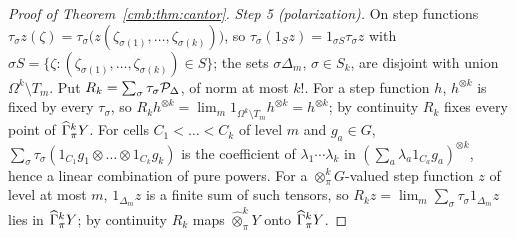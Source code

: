\begin{proof}[Proof of Theorem~\ref{cmb:thm:cantor}]
\emph{Step 5 (polarization).} On step functions $\tau_\sigma z(\zeta)=\tau_\sigma\bigl(z(\zeta_{\sigma(1)},\dots,
\zeta_{\sigma(k)})\bigr)$, so $\tau_\sigma(1_Sz)=1_{\sigma S}\tau_\sigma z$ with
$\sigma S=\{\zeta:(\zeta_{\sigma(1)},\dots,\zeta_{\sigma(k)})\in S\}$; the sets $\sigma\Delta_m$, $\sigma\in S_k$, are
disjoint with union $\Omega^k\setminus T_m$. Put $R_k=\sum_\sigma\tau_\sigma\mathcal P_\Delta$, of norm at most $k!$. For a step
function $h$, $h^{\otimes k}$ is fixed by every $\tau_\sigma$, so
$R_kh^{\otimes k}=\lim_m1_{\Omega^k\setminus T_m}h^{\otimes k}=h^{\otimes k}$; by continuity $R_k$ fixes every point of
$\widehat\Gamma^k_\pi Y$. For cells $C_1<\dots<C_k$ of level $m$ and $g_a\in G$,
$\sum_\sigma\tau_\sigma(1_{C_1}g_1\otimes\dots\otimes1_{C_k}g_k)$ is the coefficient of $\lambda_1\cdots\lambda_k$ in
$(\sum_a\lambda_a1_{C_a}g_a)^{\otimes k}$, hence a linear combination of pure powers. For a $\otimes^k_\pi G$-valued step
function $z$ of level at most $m$, $1_{\Delta_m}z$ is a finite sum of such tensors, so
$R_kz=\lim_m\sum_\sigma\tau_\sigma1_{\Delta_m}z$ lies in $\widehat\Gamma^k_\pi Y$; by continuity $R_k$ maps
$\widehat\otimes^k_\pi Y$ onto $\widehat\Gamma^k_\pi Y$.
\end{proof}

